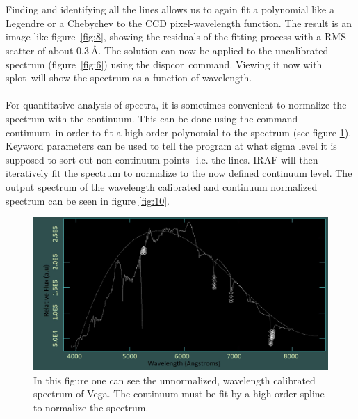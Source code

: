 \documentclass{article}
\begin{document}
~\\\\Finding and identifying all the lines allows us to again fit a polynomial like a Legendre or a Chebychev to the CCD pixel-wavelength function. The result is an image like figure~\ref{fig:8}, showing the residuals of the fitting process with a RMS-scatter of about $\SI{0.3}{\angstrom}$. The solution can now be applied to the uncalibrated spectrum (figure~\ref{fig:6}) using the \glqq dispcor\grqq ~command. Viewing it now with \glqq splot\grqq ~will show the spectrum as a function of wavelength.\\\\ For quantitative analysis of spectra, it is sometimes convenient to normalize the spectrum with the continuum. This can be done using the command \glqq continuum\grqq ~in order to fit a high order polynomial to the spectrum (see figure \ref{fig:9}). Keyword parameters can be used to tell the program at what sigma level it is supposed to sort out non-continuum points {-}i.e. the lines. IRAF will then iteratively fit the spectrum to normalize to the now defined continuum level. The output spectrum of the wavelength calibrated and continuum normalized spectrum can be seen in figure \ref{fig:10}.
\begin{figure}[H]
	\centering
    \includegraphics[width=1.00\textwidth]{spectroscopy/continuum_normalization_fitting.jpg}
  	\caption{In this figure one can see the unnormalized, wavelength calibrated spectrum of Vega. The continuum must be fit by a high order spline to normalize the spectrum.}
  	\label{fig:9}
\end{figure}
\end{document}
